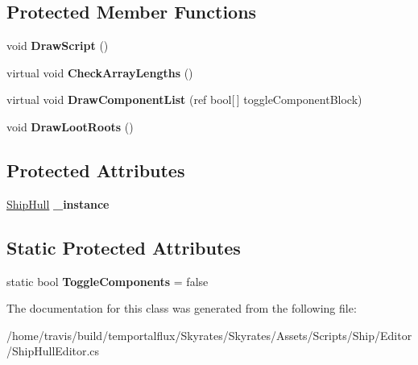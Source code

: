 \subsection*{Protected Member Functions}
\begin{DoxyCompactItemize}
\item 
\hypertarget{class_skyrates_1_1_ship_1_1_ship_hull_editor_ac06fcfa216e17f01ef87745b428ab7dd}{void {\bfseries Draw\-Script} ()}\label{class_skyrates_1_1_ship_1_1_ship_hull_editor_ac06fcfa216e17f01ef87745b428ab7dd}

\item 
\hypertarget{class_skyrates_1_1_ship_1_1_ship_hull_editor_a8bb2580a9ae47ba02cdd0b4909ea1174}{virtual void {\bfseries Check\-Array\-Lengths} ()}\label{class_skyrates_1_1_ship_1_1_ship_hull_editor_a8bb2580a9ae47ba02cdd0b4909ea1174}

\item 
\hypertarget{class_skyrates_1_1_ship_1_1_ship_hull_editor_a1e2690549bcb9ae6e719a208e74fa617}{virtual void {\bfseries Draw\-Component\-List} (ref bool\mbox{[}$\,$\mbox{]} toggle\-Component\-Block)}\label{class_skyrates_1_1_ship_1_1_ship_hull_editor_a1e2690549bcb9ae6e719a208e74fa617}

\item 
\hypertarget{class_skyrates_1_1_ship_1_1_ship_hull_editor_ae6ace06ddde35c6ca8b4a665ad9c6e35}{void {\bfseries Draw\-Loot\-Roots} ()}\label{class_skyrates_1_1_ship_1_1_ship_hull_editor_ae6ace06ddde35c6ca8b4a665ad9c6e35}

\end{DoxyCompactItemize}
\subsection*{Protected Attributes}
\begin{DoxyCompactItemize}
\item 
\hypertarget{class_skyrates_1_1_ship_1_1_ship_hull_editor_a62256e05dd8758d280b85190c001825b}{\hyperlink{class_skyrates_1_1_ship_1_1_ship_hull}{Ship\-Hull} {\bfseries \-\_\-instance}}\label{class_skyrates_1_1_ship_1_1_ship_hull_editor_a62256e05dd8758d280b85190c001825b}

\end{DoxyCompactItemize}
\subsection*{Static Protected Attributes}
\begin{DoxyCompactItemize}
\item 
\hypertarget{class_skyrates_1_1_ship_1_1_ship_hull_editor_a253913c21f9eb2b510b165866929d4c0}{static bool {\bfseries Toggle\-Components} = false}\label{class_skyrates_1_1_ship_1_1_ship_hull_editor_a253913c21f9eb2b510b165866929d4c0}

\end{DoxyCompactItemize}


The documentation for this class was generated from the following file\-:\begin{DoxyCompactItemize}
\item 
/home/travis/build/temportalflux/\-Skyrates/\-Skyrates/\-Assets/\-Scripts/\-Ship/\-Editor/Ship\-Hull\-Editor.\-cs\end{DoxyCompactItemize}
